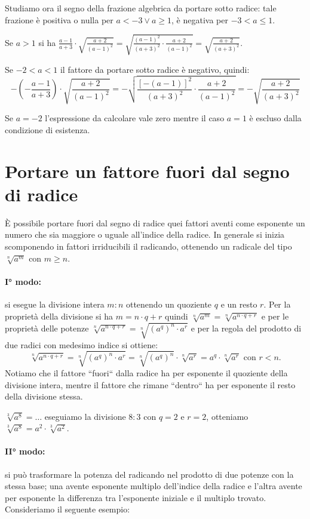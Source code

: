\begin{exrig}
\begin{esempio}
\begin{itemize}
 Studiamo ora il segno della frazione algebrica da portare sotto radice: tale frazione è positiva o nulla per $a<-3\vee a\geqslant 1$, è negativa per $-3<a\leqslant 1$.

 Se $a>1$ si ha $\frac{a-1}{a+3}\cdot \sqrt{\frac{a+2}{(a-1)^2}}=\sqrt{\frac{(a-1)^2}{(a+3)^2}\cdot \frac{a+2}{(a-1)^2}}=\sqrt{\frac{a+2}{(a+3)^2}}$.

 Se $-2<a<1$ il fattore da portare sotto radice è negativo, quindi:
 \[-\left(-\frac{a-1}{a+3}\right)\cdot \sqrt{\frac{a+2}{(a-1)^2}}=-\sqrt{\frac{[-(a-1)]^2}{(a+3)^2}\cdot \frac{a+2}{(a-1)^2}}=-\sqrt{\frac{a+2}{(a+3)^2}}\]

 Se $a=-2$ l'espressione da calcolare vale zero mentre il caso $a=1$ è escluso dalla condizione di esistenza.
 \end{itemize}
 \end{esempio}
\end{exrig}
\vspazio\ovalbox{\risolvii \ref{ese:2.40}, \ref{ese:2.41}}
\section{Portare un fattore fuori dal segno di radice}
È possibile portare fuori dal segno di radice quei fattori aventi come esponente un numero che sia maggiore o uguale all’indice della radice. In generale si inizia scomponendo in fattori irriducibili il radicando, ottenendo un radicale del tipo $\sqrt[n]{a^m}$ con $m\ge n$.

\paragraph{I° modo:} si esegue la divisione intera $m:n$ ottenendo un quoziente $q$ e un resto $r$. Per la proprietà della divisione si ha $m=n\cdot q+r$ quindi $\sqrt[n]{a^m}=\sqrt[n]{a^{n\cdot q+r}}$ e per le proprietà delle potenze $\sqrt[n]{a^{n\cdot q+r}}=\sqrt[n]{(a^q)^n\cdot a^r}$ e per la regola del prodotto di due radici con medesimo indice si ottiene:
\[\sqrt[n]{a^{n\cdot q+r}}=\sqrt[n]{(a^q)^n\cdot a^r}=\sqrt[n]{(a^q)^n}\cdot \sqrt[n]{a^r}=a^q\cdot \sqrt[n]{a^r}\text{ con } r<n.\]
Notiamo che il fattore “fuori“ dalla radice ha per esponente il quoziente della divisione intera, mentre il fattore che rimane “dentro“ ha per esponente il resto della divisione stessa.

 $\sqrt[3]{a^8}=\ldots $ eseguiamo la divisione $8:3$ con $q=2$ e $r=2$, otteniamo $\sqrt[3]{a^8}=a^2\cdot \sqrt[3]{a^2}$.

\paragraph{II° modo:} si può trasformare la potenza del radicando nel prodotto di due potenze con la stessa base; una avente esponente multiplo dell'indice della radice e l'altra avente per esponente la differenza tra l'esponente iniziale e il multiplo trovato. Consideriamo il seguente esempio:

